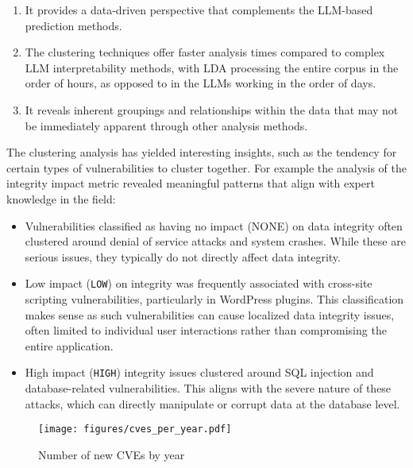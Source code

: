 \begin{enumerate}

	\item It provides a data-driven perspective that complements the LLM-based prediction methods.

	\item The clustering techniques offer faster analysis times compared to complex LLM interpretability methods, with LDA processing the entire corpus in the order of hours, as opposed to in the LLMs working in the order of days.

	\item It reveals inherent groupings and relationships within the data that may not be immediately apparent through other analysis methods.

\end{enumerate}

The clustering analysis has yielded interesting insights, such as the tendency for certain types of vulnerabilities to cluster together. For example the analysis of the integrity impact metric revealed meaningful patterns that align with expert knowledge in the field:

\begin{itemize}

	\item Vulnerabilities classified as having no impact (NONE) on data integrity often clustered around denial of service attacks and system crashes. While these are serious issues, they typically do not directly affect data integrity.

	\item Low impact (\texttt{LOW}) on integrity was frequently associated with cross-site scripting vulnerabilities, particularly in WordPress plugins. This classification makes sense as such vulnerabilities can cause localized data integrity issues, often limited to individual user interactions rather than compromising the entire application.

	\item High impact (\texttt{HIGH}) integrity issues clustered around SQL injection and database-related vulnerabilities. This aligns with the severe nature of these attacks, which can directly manipulate or corrupt data at the database level.

\end{itemize}

\begin{figure}
	\begin{center}
		\texttt{[image: figures/cves\_per\_year.pdf]}
		\caption{\label{fig:cves_per_year}Number of new CVEs by year}
	\end{center}
\end{figure}


